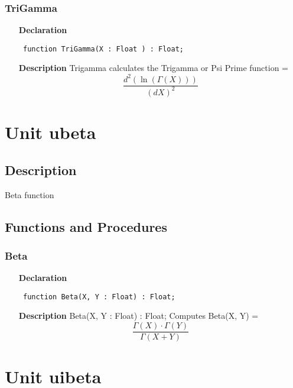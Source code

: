 \documentclass[12pt,a4paper,oneside]{report}
\newcommand{\declarationitem}[1]{\textbf{#1}}
\newcommand{\descriptiontitle}[1]{\textbf{#1}}
\newcommand{\code}[1]{\texttt{#1}}
\begin{document}
\subsubsection{TriGamma}
\label{udigamma-TriGamma}
\begin{itemize}\item[\declarationitem{Declaration}\hfill]
	\begin{flushleft}
		\code{
			function TriGamma(X : Float ) : Float;}
		
	\end{flushleft}
	
	\par
	\item[\descriptiontitle{Description}]
	Trigamma calculates the Trigamma or Psi Prime function =
	$$
	\frac{d^2(\ln(\Gamma(X)))}{(dX)^2}
	$$
\end{itemize}

\section{Unit ubeta}
\label{ubeta}
\subsection{Description}
Beta function 
\subsection{Functions and Procedures}
\subsubsection{Beta}
\label{ubeta-Beta}
\begin{itemize}\item[\declarationitem{Declaration}\hfill]
\begin{flushleft}
\code{
function Beta(X, Y : Float) : Float;}

\end{flushleft}

\par
\item[\descriptiontitle{Description}]
Beta(X, Y : Float) : Float; Computes Beta(X, Y) = 
$$
\frac{\Gamma(X) \cdot \Gamma(Y)}{\Gamma(X + Y)}
$$
\end{itemize}

\section{Unit uibeta}
\label{uibeta}
\end{document}
